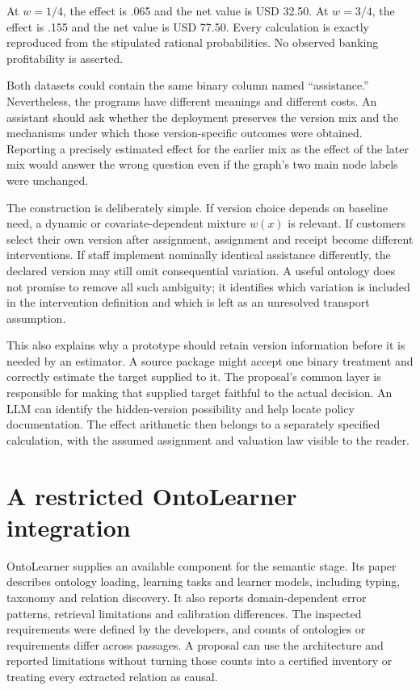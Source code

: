 At \(w=1/4\), the effect is .065 and the net value is USD 32.50. At
\(w=3/4\), the effect is .155 and the net value is USD 77.50. Every
calculation is exactly reproduced from the stipulated rational
probabilities. No observed banking profitability is asserted.
\citep{exec13_ontology_examples}

Both datasets could contain the same binary column named ``assistance.''
Nevertheless, the programs have different meanings and different costs.
An assistant should ask whether the deployment preserves the version mix
and the mechanisms under which those version-specific outcomes were
obtained. Reporting a precisely estimated effect for the earlier mix as
the effect of the later mix would answer the wrong question even if the
graph's two main node labels were unchanged.

The construction is deliberately simple. If version choice depends on
baseline need, a dynamic or covariate-dependent mixture \(w(x)\) is
relevant. If customers select their own version after assignment,
assignment and receipt become different interventions. If staff
implement nominally identical assistance differently, the declared
version may still omit consequential variation. A useful ontology does
not promise to remove all such ambiguity; it identifies which variation
is included in the intervention definition and which is left as an
unresolved transport assumption.

This also explains why a prototype should retain version information
before it is needed by an estimator. A source package might accept one
binary treatment and correctly estimate the target supplied to it. The
proposal's common layer is responsible for making that supplied target
faithful to the actual decision. An LLM can identify the hidden-version
possibility and help locate policy documentation. The effect arithmetic
then belongs to a separately specified calculation, with the assumed
assignment and valuation law visible to the reader.

\hypertarget{a-restricted-ontolearner-integration}{%
\section{A restricted OntoLearner
integration}\label{a-restricted-ontolearner-integration}}

OntoLearner supplies an available component for the semantic stage. Its
paper describes ontology loading, learning tasks and learner models,
including typing, taxonomy and relation discovery. It also reports
domain-dependent error patterns, retrieval limitations and calibration
differences. The inspected requirements were defined by the developers,
and counts of ontologies or requirements differ across passages. A
proposal can use the architecture and reported limitations without
turning those counts into a certified inventory or treating every
extracted relation as causal. \citep{v12_la_2607_01977}

